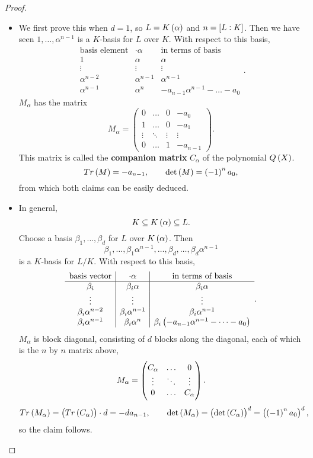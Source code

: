 \begin{proof}
\hfill
\begin{itemize}
\item We first prove this when $ d = 1 $, so $ L = K\br{\alpha} $ and $ n = \sbr{L : K} $. Then we have seen $ 1, \dots, \alpha^{n - 1} $ is a $ K $-basis for $ L $ over $ K $. With respect to this basis,
$$
\begin{array}{c|c|c}
\text{basis element} & \cdot \alpha & \text{in terms of basis} \\
\hline
1 & \alpha & \alpha \\
\vdots & \vdots & \vdots \\
\alpha^{n - 2} & \alpha^{n - 1} & \alpha^{n - 1} \\
\alpha^{n - 1} & \alpha^n & -a_{n - 1}\alpha^{n - 1} - \dots - a_0
\end{array}.
$$
$ M_\alpha $ has the matrix
$$ M_\alpha =
\begin{pmatrix}
0 & \dots & 0 & -a_0 \\
1 & \dots & 0 & -a_1 \\
\vdots & \ddots & \vdots & \vdots \\
0 & \dots & 1 & -a_{n - 1}
\end{pmatrix}.
$$
This matrix is called the \textbf{companion matrix} $ C_\alpha $ of the polynomial $ Q\br{X} $.
$$ Tr\br{M} = -a_{n - 1}, \qquad \det\br{M} = \br{-1}^na_0, $$
from which both claims can be easily deduced.
\item In general,
$$ K \subseteq K\br{\alpha} \subseteq L. $$
Choose a basis $ \beta_1, \dots, \beta_d $ for $ L $ over $ K\br{\alpha} $. Then
$$ \beta_1, \dots, \beta_1\alpha^{n - 1}, \dots, \beta_d, \dots, \beta_d\alpha^{n - 1} $$
is a $ K $-basis for $ L / K $. With respect to this basis,
$$
\begin{array}{c|c|c}
\text{basis vector} & \cdot \alpha & \text{in terms of basis} \\
\hline
\beta_i & \beta_i\alpha & \beta_i\alpha \\
\vdots & \vdots & \vdots \\
\beta_i\alpha^{n - 2} & \beta_i\alpha^{n - 1} & \beta_i\alpha^{n - 1} \\
\beta_i\alpha^{n - 1} & \beta_i\alpha^n & \beta_i\br{-a_{n - 1}\alpha^{n - 1} - \dots - a_0} \\
\end{array}.
$$
$ M_\alpha $ is block diagonal, consisting of $ d $ blocks along the diagonal, each of which is the $ n $ by $ n $ matrix above,
$$ M_\alpha = \threebythree{C_\alpha}{\dots}{0}{\vdots}{\ddots}{\vdots}{0}{\dots}{C_\alpha}. $$
$$ Tr\br{M_\alpha} = \br{Tr\br{C_\alpha}} \cdot d = -da_{n - 1}, \qquad \det\br{M_\alpha} = \br{\det\br{C_\alpha}}^d = \br{\br{-1}^na_0}^d, $$
so the claim follows.
\end{itemize}
\end{proof}

